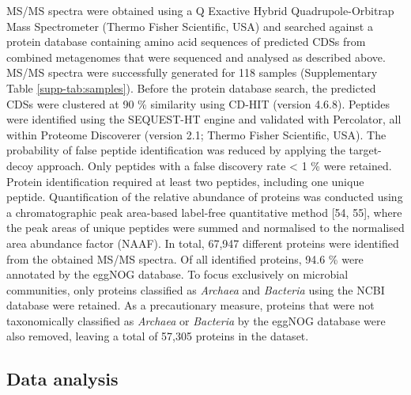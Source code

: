 \documentclass[
  12 pt,
]{article}
\begin{document}
MS/MS spectra were obtained using a Q Exactive Hybrid Quadrupole-Orbitrap Mass Spectrometer (Thermo Fisher Scientific, USA) and searched against a protein database containing amino acid sequences of predicted CDSs from combined metagenomes that were sequenced and analysed as described above. MS/MS spectra were successfully generated for 118 samples (Supplementary Table \ref{supp-tab:samples}). Before the protein database search, the predicted CDSs were clustered at 90 \si{\percent} similarity using CD-HIT (version 4.6.8). Peptides were identified using the SEQUEST-HT engine and validated with Percolator, all within Proteome Discoverer (version 2.1; Thermo Fisher Scientific, USA). The probability of false peptide identification was reduced by applying the target-decoy approach. Only peptides with a false discovery rate \textless{} 1 \si{\percent} were retained. Protein identification required at least two peptides, including one unique peptide. Quantification of the relative abundance of proteins was conducted using a chromatographic peak area-based label-free quantitative method {[}54, 55{]}, where the peak areas of unique peptides were summed and normalised to the normalised area abundance factor (NAAF). In total, 67,947 different proteins were identified from the obtained MS/MS spectra. Of all identified proteins, 94.6 \si{\percent} were annotated by the eggNOG database. To focus exclusively on microbial communities, only proteins classified as \emph{Archaea} and \emph{Bacteria} using the NCBI database were retained. As a precautionary measure, proteins that were not taxonomically classified as \emph{Archaea} or \emph{Bacteria} by the eggNOG database were also removed, leaving a total of 57,305 proteins in the dataset.

\hypertarget{data-analysis}{%
\subsection{Data analysis}\label{data-analysis}}
\end{document}
